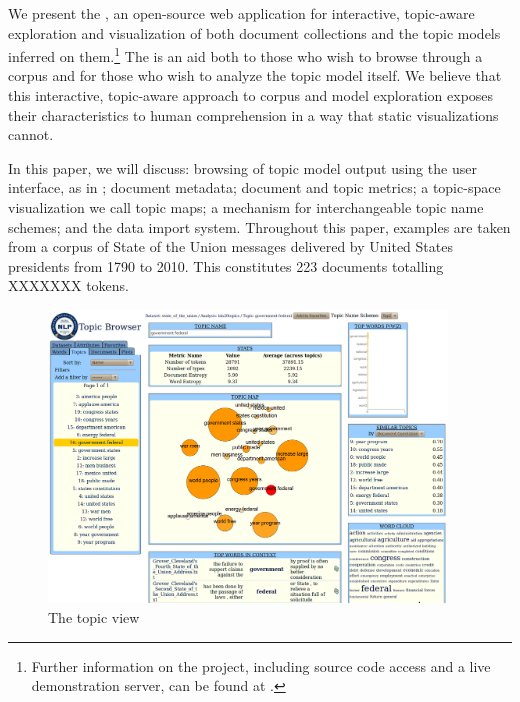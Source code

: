 \documentclass[11pt]{article}
\begin{document}
We present the \tool, an open-source web application for interactive,
topic-aware exploration and visualization of both document collections and the
topic models inferred on them.\footnote{Further information on the project, including
source code access and a live demonstration server, can be found
at \texttt{\projecturl}.} The \tool{} is an aid both to those who wish to
browse through a corpus and for those who wish to analyze the topic model itself.
We believe that this interactive, topic-aware approach to corpus and model exploration
exposes their characteristics to human comprehension in a way that static visualizations cannot.

In this paper, we will discuss: browsing of topic model output using the \tool{} user interface, as in \cite{gardner_browser_2010};
document metadata; document and topic metrics; a topic-space visualization we call
topic maps; a mechanism for interchangeable topic name schemes; and the data import%
system. Throughout this paper, examples are taken from a
corpus of State of the Union messages delivered by United States presidents
from 1790 to 2010. This constitutes 223 documents totalling XXXXXXX tokens. %

\begin{figure}[t]%
 \centering
 \includegraphics[width=400px,keepaspectratio=true]{./topic_page_take2.png}
 \caption{The topic view}
 \label{fig:topic_page}
\end{figure}
\end{document}
